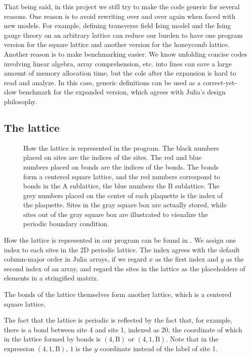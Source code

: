 \documentclass[hyperref, a4paper]{article}
\newcommand*{\tfim}{transverse field Ising model}
\begin{document}
That being said, in this project we still try to make the code generic for several reasons.
One reason is to avoid rewriting over and over again when faced with new models. 
For example, defining \tfim{} and the Ising gauge theory on an arbitrary lattice can reduce our burden to have one program version for the square lattice and another version for the honeycomb lattice.
Another reason is to make benchmarking easier. 
We know unfolding concise codes involving linear algebra, array comprehension, etc. into lines can save a large amount of memory allocation time,
but the cole after the expansion is hard to read and analyze.
In this case, generic definitions can be used as a correct-yet-slow benchmark for the expanded version, which agrees with Julia's design philosophy.

\subsection{The lattice}

\begin{figure}
    
    \caption{How the lattice is represented in the program. 
    The black numbers placed on sites are the indices of the sites.
    The red and blue numbers placed on bonds are the indices of the bonds. The bonds form a centered square lattice, and the red numbers correspond to bonds in the A sublattice, the blue numbers the B sublattice.
    The grey numbers placed on the center of each plaquette is the index of the plaquette.
    Sites in the gray square box are actually stored, while sites out of the gray square box are illustrated to visualize the periodic boundary condition.}
    \label{fig:label-representation}
\end{figure}

How the lattice is represented in our program can be found in .
We assign one index to each sites in the 2D periodic lattice.
The index agrees with the default column-major order in Julia arrays, if we regard $x$ as the first index and $y$ as the second index of an array, and regard the sites in the lattice as the placeholders of elements in a stringified matrix.

The bonds of the lattice themselves form another lattice, which is a centered square lattice.

The fact that the lattice is periodic is reflected by the fact that, for example, there is a bond between site 4 and site 1, indexed as 20, the coordinate of which in the lattice formed by bonds is $(4, \text{B})$ or $(4, 1, \text{B})$.
Note that in the expression $(4, 1, \text{B})$, $1$ is the $y$ coordinate instead of the label of site 1.
\end{document}

